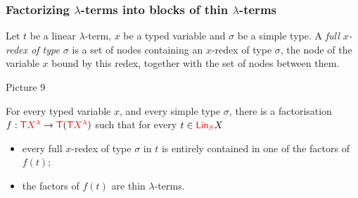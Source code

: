   



\subsubsection{Factorizing $\lambda$-terms into blocks of thin $\lambda$-terms}

\begin{definition}
Let $t$ be a linear $\lambda$-term, $x$ be a typed variable and $\sigma$ be a simple type. A \emph{full $x$-redex of type $\sigma$} is a set of nodes  containing an $x$-redex of type $\sigma$, the node of the variable $x$ bound by this redex, together with the set of nodes between them.
\end{definition}
Picture 9


\begin{proposition}\label{prop:FactoIntoThin}
For every typed variable $x$, and every simple type $\sigma$, there is a factorisation $f:{\color{red}{\mathsf T}} {\color{red}{X^\lambda}} \to {\color{red}{\mathsf T}}({\color{red}{\mathsf T}} {\color{red}{X^\lambda}})$ such that for every $t\in{\color{red}{\mathsf{Lin}_{S}}} X$
\begin{itemize}
\item every full $x$-redex of type $\sigma$ in $t$ is entirely contained in one of the factors of $f(t)$;
\item the factors of $f(t)$ are thin $\lambda$-terms.
\end{itemize}
\end{proposition}

